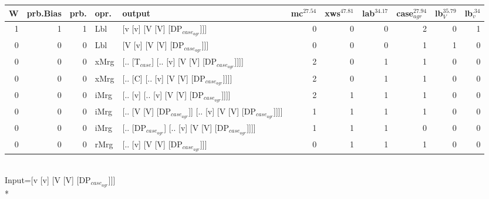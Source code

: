 \begin{tabularx}{\linewidth}{rrrlXrrrrrr}
\hline
   W &   prb.Bias &   prb. & opr.   & output                                                    &   mc$^{27.54}$ &   xws$^{47.81}$ &   lab$^{34.17}$ &   case$_{agr}^{27.94}$ &   lb$_{V}^{35.79}$ &   lb$_{v}^{.34}$ \\
\hline
   1 &       1 &   1 & Lbl  & [v [v] [V [V] [DP$_{case_{agr}}$]]]                             &            0 &             0 &             0 &                  2 &              0 &             1 \\
   0 &       0 &   0 & Lbl  & [V [v] [V [V] [DP$_{case_{agr}}$]]]                             &            0 &             0 &             0 &                  1 &              1 &             0 \\
   0 &       0 &   0 & xMrg & [.. [T$_{case}$] [.. [v] [V [V] [DP$_{case_{agr}}$]]]]              &            2 &             0 &             1 &                  1 &              0 &             0 \\
   0 &       0 &   0 & xMrg & [.. [C] [.. [v] [V [V] [DP$_{case_{agr}}$]]]]                   &            2 &             0 &             1 &                  1 &              0 &             0 \\
   0 &       0 &   0 & iMrg & [.. [v] [.. [v] [V [V] [DP$_{case_{agr}}$]]]]                   &            2 &             1 &             1 &                  1 &              0 &             0 \\
   0 &       0 &   0 & iMrg & [.. [V [V] [DP$_{case_{agr}}$]] [.. [v] [V [V] [DP$_{case_{agr}}$]]]] &            1 &             1 &             1 &                  1 &              0 &             0 \\
   0 &       0 &   0 & iMrg & [.. [DP$_{case_{agr}}$] [.. [v] [V [V] [DP$_{case_{agr}}$]]]]         &            1 &             1 &             1 &                  0 &              0 &             0 \\
   0 &       0 &   0 & rMrg & [.. [v] [V [V] [DP$_{case_{agr}}$]]]                            &            0 &             1 &             1 &                  1 &              0 &             0 \\
\hline
\end{tabularx}\endgroup\\
\begingroup\scriptsize Input=[v [v] [V [V] [DP$_{case_{agr}}$]]]\\*

